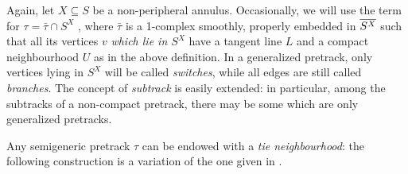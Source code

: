 Again, let $X\subseteq S$ be a non-peripheral annulus. Occasionally, we will use the term  for $\tau=\bar \tau\cap S^X$ , where $\bar\tau$ is a 1-complex smoothly, properly embedded in $\overline{S^X}$ such that all its vertices $v$ \emph{which lie in $S^X$} have a tangent line $L$ and a compact neighbourhood $U$ as in the above definition. In a generalized pretrack, only vertices lying in $S^X$ will be called \emph{switches}, while all edges are still called \emph{branches}. The concept of \emph{subtrack} is easily extended: in particular, among the subtracks of a non-compact pretrack, there may be some which are only generalized pretracks.

Any semigeneric pretrack $\tau$ can be endowed with a \emph{tie neighbourhood}: the following construction is a variation of the one given in \cite{mms}.
 
